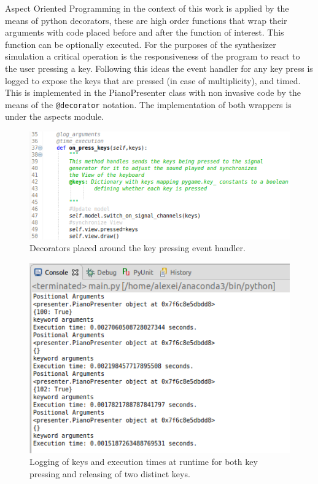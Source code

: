\documentclass[margin,line,a4paper,authoryear,12pt]{report}
\begin{document}
Aspect Oriented Programming in the context of this work is applied by 
the means of python decorators, these are high order functions that 
wrap their arguments with code placed before and after the function of interest.
This function can be optionally executed. For the purposes of the synthesizer 
simulation a critical operation is the responsiveness of the program to react to the
user pressing a key. Following this ideas the event handler for any key press is logged
to expose the keys that are pressed (in case of multiplicity), and timed. This is implemented in the PianoPresenter class with non invasive code
by the means of the \texttt{@decorator} notation. 
The implementation of both wrappers is under the aspects module.
\begin{figure}[h!]
    \centering
    \includegraphics[width=0.8\linewidth]{Piano_presenter_event.png}
    \caption{ Decorators placed around the key pressing event handler.}
    \label{fig:aspects}
\end{figure}

\begin{figure}[h!]
    \centering
    \includegraphics[width=0.8\linewidth]{PianoPresenter_log_time.png}
    \caption{Logging of keys and execution times at runtime for both key pressing and releasing of two distinct keys.}
    \label{fig:aspects}
\end{figure}
\end{document}
